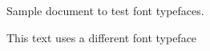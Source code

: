 \documentclass{article}
\begin{document}
Sample document to test font typefaces.
 
This text uses a different font typeface
\end{document}
